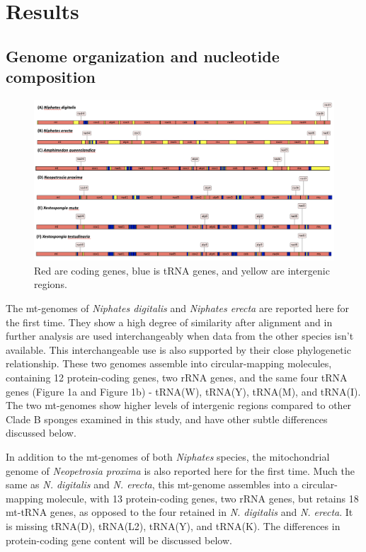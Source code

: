 \documentclass[../main.tex]{subfiles}
\begin{document}
\section{Results}

\subsection {Genome organization and nucleotide composition}

\begin{figure}[htp]
    \centering
    \includegraphics[width=1.0\textwidth]{Figures/figure 1.png}
    \caption{Red are coding genes, blue is tRNA genes, and yellow are intergenic regions.}
\end{figure}

The mt-genomes of \emph{Niphates digitalis} and \emph{Niphates erecta} are reported here for the first time. They show a high degree of similarity after alignment and in further analysis are used interchangeably when data from the other species isn't available. This interchangeable use is also supported by their close phylogenetic relationship. These two genomes assemble into circular-mapping molecules, containing 12 protein-coding genes, two rRNA genes, and the same four tRNA genes (Figure 1a and Figure 1b) - tRNA(W), tRNA(Y), tRNA(M), and tRNA(I). The two mt-genomes show higher levels of intergenic regions compared to other Clade B sponges examined in this study, and have other subtle differences discussed below.

In addition to the mt-genomes of both \emph{Niphates} species, the mitochondrial genome of \emph{Neopetrosia proxima} is also reported here for the first time. Much the same as \emph{N. digitalis} and \emph{N. erecta}, this mt-genome assembles into a circular-mapping molecule, with 13 protein-coding genes, two rRNA genes, but retains 18 mt-tRNA genes, as opposed to the four retained in \emph{N. digitalis} and \emph{N. erecta}. It is missing tRNA(D), tRNA(L2), tRNA(Y), and tRNA(K). The differences in protein-coding gene content will be discussed below.
\end{document}
